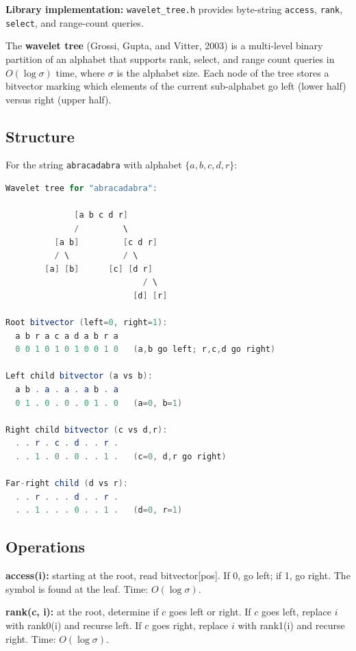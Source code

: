 \textbf{Library implementation:} \texttt{wavelet\_tree.h} provides byte-string \texttt{access}, \texttt{rank}, \texttt{select}, and range-count queries.

The \textbf{wavelet tree} (Grossi, Gupta, and Vitter, 2003) is a multi-level binary partition of an alphabet that supports rank, select, and range count queries in $O(\log \sigma)$ time, where $\sigma$ is the alphabet size. Each node of the tree stores a bitvector marking which elements of the current sub-alphabet go left (lower half) versus right (upper half).

\subsection{Structure}

For the string \texttt{abracadabra} with alphabet $\{a, b, c, d, r\}$:

\begin{lstlisting}[language=Java]
Wavelet tree for "abracadabra":

              [a b c d r]
              /         \
          [a b]         [c d r]
          / \           / \
        [a] [b]      [c] [d r]
                            / \
                          [d] [r]

Root bitvector (left=0, right=1):
  a b r a c a d a b r a
  0 0 1 0 1 0 1 0 0 1 0   (a,b go left; r,c,d go right)

Left child bitvector (a vs b):
  a b . a . a . a b . a
  0 1 . 0 . 0 . 0 1 . 0   (a=0, b=1)

Right child bitvector (c vs d,r):
  . . r . c . d . . r .
  . . 1 . 0 . 0 . . 1 .   (c=0, d,r go right)

Far-right child (d vs r):
  . . r . . . d . . r .
  . . 1 . . . 0 . . 1 .   (d=0, r=1)
\end{lstlisting}

\subsection{Operations}

\textbf{access(i):} starting at the root, read bitvector[pos]. If 0, go left; if 1, go right. The symbol is found at the leaf. Time: $O(\log \sigma)$.

\textbf{rank(c, i):} at the root, determine if $c$ goes left or right. If $c$ goes left, replace $i$ with rank0(i) and recurse left. If $c$ goes right, replace $i$ with rank1(i) and recurse right. Time: $O(\log \sigma)$.

